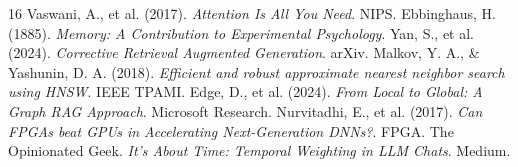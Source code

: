 \documentclass[11pt, a4paper]{article}
\begin{document}
	\begin{thebibliography}{16}
		 Vaswani, A., et al. (2017). \textit{Attention Is All You Need}. NIPS.
		 Ebbinghaus, H. (1885). \textit{Memory: A Contribution to Experimental Psychology}. 
         Yan, S., et al. (2024). \textit{Corrective Retrieval Augmented Generation}. arXiv.
		 Malkov, Y. A., \& Yashunin, D. A. (2018). \textit{Efficient and robust approximate nearest neighbor search using HNSW}. IEEE TPAMI.
		 Edge, D., et al. (2024). \textit{From Local to Global: A Graph RAG Approach}. Microsoft Research.
		 Nurvitadhi, E., et al. (2017). \textit{Can FPGAs beat GPUs in Accelerating Next-Generation DNNs?}. FPGA.
		 The Opinionated Geek. \textit{It's About Time: Temporal Weighting in LLM Chats}. Medium.
	\end{thebibliography}
	
\end{document}
